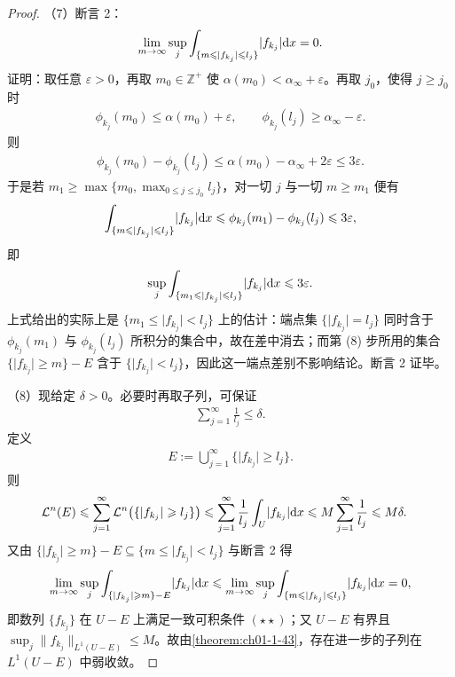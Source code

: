 \documentclass[../../main.tex]{subfiles}%
\begin{document}
\begin{proof}
（7）断言 2：
\begin{align*}
\lim_{m\to\infty}\sup_j\int_{\{m\leqslant\lvert f_{k_j}\rvert\leqslant l_j\}}\lvert f_{k_j}\rvert\mathrm{d} x=0 .
\end{align*}
证明：取任意 $\varepsilon>0$，再取 $m_0\in\mathbb{Z}^+$ 使 $\alpha(m_0)<\alpha_\infty+\varepsilon$。再取 $j_0$，使得 $j\geqslant j_0$ 时
\begin{align*}
\phi_{k_j}(m_0)\leqslant\alpha(m_0)+\varepsilon,\qquad\phi_{k_j}(l_j)\geqslant\alpha_\infty-\varepsilon .
\end{align*}
则
\begin{align*}
\phi_{k_j}(m_0)-\phi_{k_j}(l_j)\leqslant\alpha(m_0)-\alpha_\infty+2\varepsilon\leqslant3\varepsilon .
\end{align*}
于是若 $m_1\geqslant\max\{m_0,\max_{0\leqslant j\leqslant j_0}l_j\}$，对一切 $j$ 与一切 $m\geqslant m_1$ 便有
\begin{align*}
\int_{\{m\leqslant\lvert f_{k_j}\rvert\leqslant l_j\}}\lvert f_{k_j}\rvert\mathrm{d} x\leqslant\phi_{k_j}(m_1)-\phi_{k_j}(l_j)\leqslant3\varepsilon,
\end{align*}
即
\begin{align*}
\sup_j\int_{\{m_1\leqslant\lvert f_{k_j}\rvert\leqslant l_j\}}\lvert f_{k_j}\rvert\mathrm{d} x\leqslant3\varepsilon .
\end{align*}
上式给出的实际上是 $\{m_1\leqslant\lvert f_{k_j}\rvert<l_j\}$ 上的估计：端点集 $\{\lvert f_{k_j}\rvert=l_j\}$ 同时含于 $\phi_{k_j}(m_1)$ 与 $\phi_{k_j}(l_j)$ 所积分的集合中，故在差中消去；而第 (8) 步所用的集合 $\{\lvert f_{k_j}\rvert\geqslant m\}-E$ 含于 $\{\lvert f_{k_j}\rvert<l_j\}$，因此这一端点差别不影响结论。断言 2 证毕。

（8）现给定 $\delta>0$。必要时再取子列，可保证
\begin{align*}
\sum_{j=1}^{\infty}\frac{1}{l_j}\leqslant\delta .
\end{align*}
定义
\begin{align*}
E:=\bigcup_{j=1}^{\infty}\{\lvert f_{k_j}\rvert\geqslant l_j\}.
\end{align*}
则
\begin{align*}
\mathcal{L}^n(E)&\leqslant\sum_{j=1}^{\infty}\mathcal{L}^n\bigl(\{\lvert f_{k_j}\rvert\geqslant l_j\}\bigr)
\leqslant\sum_{j=1}^{\infty}\frac{1}{l_j}\int_U\lvert f_{k_j}\rvert\mathrm{d} x\leqslant M\sum_{j=1}^{\infty}\frac{1}{l_j}\leqslant M\delta .
\end{align*}
又由 $\{\lvert f_{k_j}\rvert\geqslant m\}-E\subseteq\{m\leqslant\lvert f_{k_j}\rvert<l_j\}$ 与断言 2 得
\begin{align*}
\lim_{m\to\infty}\sup_j\int_{\{\lvert f_{k_j}\rvert\geqslant m\}-E}\lvert f_{k_j}\rvert\mathrm{d} x
\leqslant\lim_{m\to\infty}\sup_j\int_{\{m\leqslant\lvert f_{k_j}\rvert\leqslant l_j\}}\lvert f_{k_j}\rvert\mathrm{d} x=0,
\end{align*}
即数列 $\{f_{k_j}\}$ 在 $U-E$ 上满足一致可积条件 $(\star\star)$；又 $U-E$ 有界且 $\sup_j\lVert f_{k_j}\rVert_{L^1(U-E)}\leqslant M$。故由\cref{theorem:ch01-1-43}，存在进一步的子列在 $L^1(U-E)$ 中弱收敛。%


\end{proof}
\end{document}
